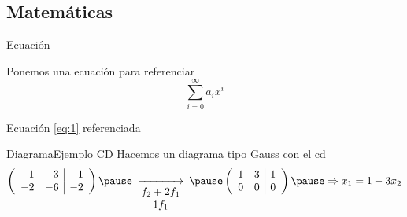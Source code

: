 \documentclass[11pt]{beamer}
\begin{document}
\subsection{Matemáticas}
	\begin{frame}{Ecuación}
		
		Ponemos una ecuación para referenciar
		\begin{equation} \label{eq:1} 
			\sum_{i=0}^{\infty} a_i x^i
		\end{equation}
		
		Ecuación \ref{eq:1} referenciada
		
	\end{frame}

	\begin{frame}{Diagrama}{Ejemplo CD}
		Hacemos un diagrama tipo Gauss con el cd
		\[
		\begin{CD}
			\left(\begin{array}{rr|r}
				1&3&1\\
				-2&-6&-2
			\end{array}\right) \pause @>>{\begin{matrix}
					f_2+2f_1\\1f_1
			\end{matrix}}> \pause
			\left(\begin{array}{rr|r}
				1&3&1\\
				0&0&0
			\end{array}\right) \pause \Rightarrow x_1=1-3x_2
		\end{CD}
		\]
	\end{frame}
\end{document}
